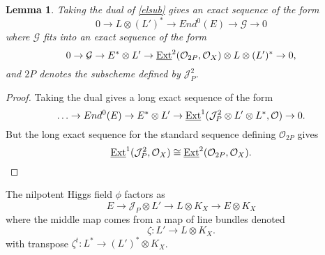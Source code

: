 \documentclass{amsart}
\theoremstyle{plain}
\newtheorem{lemma}[theorem]{Lemma}
\numberwithin{equation}{section}
\begin{document}
\begin{lemma}
\label{gdef}
Taking the dual of \eqref{elsub} gives an exact sequence of the form
$$
0\rightarrow L\otimes (L')^{\ast} \rightarrow End ^0(E)
\rightarrow {{\mathcal G}} \rightarrow 0
$$
where ${{\mathcal G}}$ fits into an exact sequence of the form
$$
0\rightarrow {{\mathcal G}} \rightarrow E^{\ast}\otimes L' \rightarrow {\underline{{\rm Ext}}} ^2({{\mathcal O}} _{2P},{{\mathcal O}} _X)\otimes
 L\otimes (L')^{\ast}\rightarrow 0,
$$
and $2P$ denotes the subscheme defined by ${{\mathcal J}} _P^2$. 
\end{lemma}
\begin{proof}
Taking the dual gives a long exact sequence of the form
$$
\ldots \rightarrow End ^0(E)\rightarrow E^{\ast}\otimes L'
\rightarrow {\underline{{\rm Ext}}} ^1({{\mathcal J}} _P^2\otimes L'\otimes L^{\ast} , {{\mathcal O}} )\rightarrow 0.
$$
But the long exact sequence for the standard sequence defining ${{\mathcal O}} _{2P}$ gives
$$
{\underline{{\rm Ext}}} ^1({{\mathcal J}} _P^2,{{\mathcal O}} _X)\cong {\underline{{\rm Ext}}} ^2({{\mathcal O}} _{2P},{{\mathcal O}} _X).
$$
\end{proof}

The nilpotent Higgs field $\phi$ factors as 
$$
E\rightarrow {{\mathcal J}} _P\otimes L'\rightarrow L\otimes K_X \rightarrow E\otimes K_X
$$
where the middle map comes from a map of line bundles
denoted 
$$
\zeta : L'\rightarrow L\otimes K_X.
$$
with transpose $\zeta ^t : L^{\ast}\rightarrow (L')^{\ast}\otimes K_X$.
\end{document}
